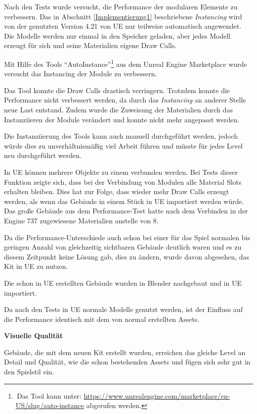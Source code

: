 \par
Nach den Tests wurde versucht, die Performance der modularen Elemente zu verbessern. Das in Abschnitt \ref{Implementierung1} beschriebene \textit{Instancing} wird von der genutzten Version 4.21 von UE nur teilweise automatisch angewendet. Die Modelle werden nur einmal in den Speicher geladen, aber jedes Modell erzeugt für sich und seine Materialien eigene Draw Calls.
\par
Mit Hilfe des Tools \enquote{AutoInstance}\footnote{\,Das Tool kann unter: \url{https://www.unrealengine.com/marketplace/en-US/slug/auto-instance} abgerufen werden.} aus dem Unreal Engine Marketplace wurde versucht das Instancing der Module zu verbessern.
\par
Das Tool konnte die Draw Calls drastisch verringern. Trotzdem konnte die Performance nicht verbessert werden, da durch das \textit{Instancing} an anderer Stelle neue Last entstand. Zudem wurde die Zuweisung der Materialien durch das Instanziieren der Module verändert und konnte nicht mehr angepasst werden.
\par
Die Instanziierung des Tools kann auch manuell durchgeführt werden, jedoch würde dies zu unverhältnismäßig viel Arbeit führen und müsste für jedes Level neu durchgeführt werden.
\par
In UE können mehrere Objekte zu einem verbunden werden. Bei Tests dieser Funktion zeigte sich, dass bei der Verbindung von Modulen alle Material Slots erhalten bleiben. Dies hat zur Folge, dass wieder mehr Draw Calls erzeugt werden, als wenn das Gebäude in einem Stück in UE importiert werden würde. Das große Gebäude aus dem Performance-Test hatte nach dem Verbinden in der Engine 737 zugewiesene Materialien anstelle von 8.
\par
Da die Performance-Unterschiede auch schon bei einer für das Spiel normalen bis geringen Anzahl von gleichzeitig sichtbaren Gebäude deutlich waren und es zu diesem Zeitpunkt keine Lösung gab, dies zu ändern, wurde davon abgesehen, das Kit in UE zu nutzen.
\par
Die schon in UE erstellten Gebäude wurden in Blender nachgebaut und in UE importiert.
\par
Da nach den Tests in UE normale Modelle genutzt werden, ist der Einfluss auf die Performance identisch mit dem von normal erstellten Assets.
\par\textbf{Visuelle Qualität}\par
Gebäude, die mit dem neuen Kit erstellt wurden, erreichen das gleiche Level an Detail und Qualität, wie die schon bestehenden Assets und fügen sich sehr gut in den Spielstil ein.
